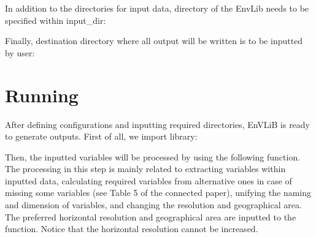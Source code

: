 \documentclass[a4paper,11pt,english]{sphinxmanual}
\begin{document}
In addition to the directories for input data, directory of the EnvLib needs to be specified within input\_dir:

\begin{sphinxVerbatim}[commandchars=\\\{\}]
 \PYG{p}{[}\PYG{p}{]}        
\end{sphinxVerbatim}

Finally, destination directory where all output will be written is to be inputted by user:

\begin{sphinxVerbatim}[commandchars=\\\{\}]
      
\end{sphinxVerbatim}


\section{Running}
\label{\detokenize{gStarted:running}}
After defining configurations and inputting required directories, EnVLiB is ready to generate outputs. First of all, we import library:

\begin{sphinxVerbatim}[commandchars=\\\{\}]
 
   
\end{sphinxVerbatim}

Then, the inputted variables will be processed by using the following function. The processing in this step is mainly related to extracting variables within inputted data, calculating required variables from alternative ones in case of missing some variables (see Table 5 of the connected paper), unifying the naming and dimension of variables, and changing the resolution and geographical area.
The preferred horizontal resolution and geographical area are inputted to the function. Notice that the horizontal resolution cannot be increased.

\begin{sphinxVerbatim}[commandchars=\\\{\}]
        
\end{sphinxVerbatim}
\end{document}
